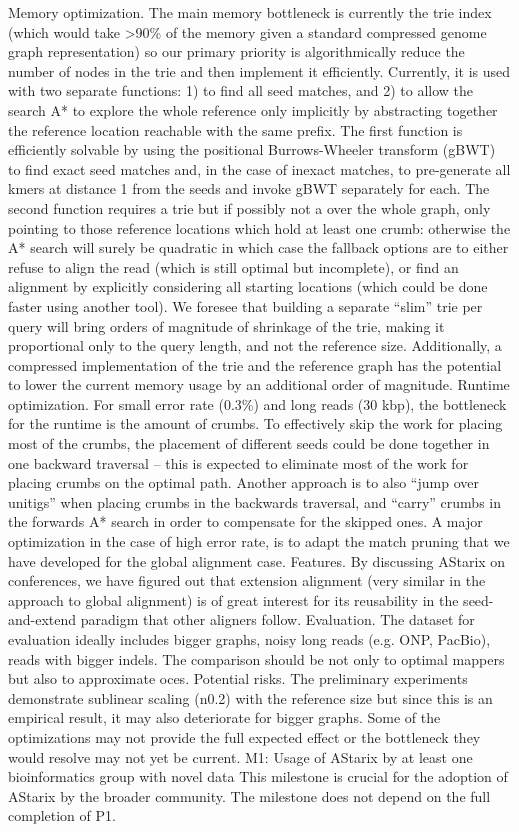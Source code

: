 Memory optimization. The main memory bottleneck is currently the trie index (which would take >90\% of the memory given a standard compressed genome graph representation) so our primary priority is algorithmically reduce the number of nodes in the trie and then implement it efficiently. Currently, it is used with two separate functions: 1) to find all seed matches, and 2) to allow the search A* to explore the whole reference only implicitly by abstracting together the reference location reachable with the same prefix. The first function is efficiently solvable by using the positional Burrows-Wheeler transform (gBWT) to find exact seed matches and, in the case of inexact matches, to pre-generate all kmers at distance 1 from the seeds and invoke gBWT separately for each. The second function requires a trie but if possibly not a over the whole graph, only pointing to those reference locations which hold at least one crumb: otherwise the A* search will surely be quadratic in which case the fallback options are to either refuse to align the read (which is still optimal but incomplete), or find an alignment by explicitly considering all starting locations (which could be done faster using another tool). We foresee that building a separate “slim” trie per query will bring orders of magnitude of shrinkage of the trie, making it proportional only to the query length, and not the reference size. Additionally, a compressed implementation of the trie and the reference graph has the potential to lower the current memory usage by an additional order of magnitude.
Runtime optimization. For small error rate (0.3\%) and long reads (30 kbp), the bottleneck for the runtime is the amount of crumbs. To effectively skip the work for placing most of the crumbs, the placement of different seeds could be done together in one backward traversal – this is expected to eliminate most of the work for placing crumbs on the optimal path.  Another approach is to also “jump over unitigs” when placing crumbs in the backwards traversal, and “carry” crumbs in the forwards A* search in order to compensate for the skipped ones. A major optimization in the case of high error rate, is to adapt the match pruning that we have developed for the global alignment case. 
Features. By discussing AStarix on conferences, we have figured out that extension alignment (very similar in the approach to global alignment) is of great interest for its reusability in the seed-and-extend paradigm that other aligners follow.
Evaluation. The dataset for evaluation ideally includes bigger graphs, noisy long reads (e.g. ONP, PacBio), reads with bigger indels. The comparison should be not only to optimal mappers but also to approximate oces.
Potential risks. The preliminary experiments demonstrate sublinear scaling (n0.2) with the reference size but since this is an empirical result, it may also deteriorate for bigger graphs. Some of the optimizations may not provide the full expected effect or the bottleneck they would resolve may not yet be current.
M1: Usage of AStarix by at least one bioinformatics group with novel data
This milestone is crucial for the adoption of AStarix by the broader community. The milestone does not depend on the full completion of P1.

